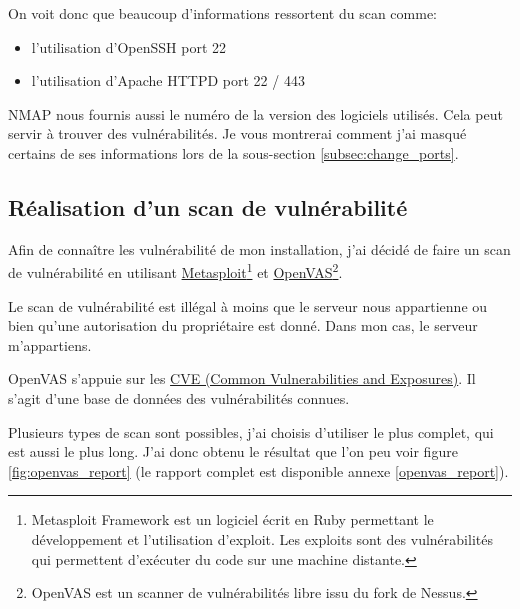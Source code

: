 \documentclass[]{report}
\begin{document}
      On voit donc que beaucoup d'informations ressortent du scan comme:

      \begin{itemize}
        \item l'utilisation d'OpenSSH port 22
        \item l'utilisation d'Apache HTTPD port 22 / 443
      \end{itemize}

      NMAP nous fournis aussi le numéro de la version des logiciels utilisés. Cela peut servir à trouver des vulnérabilités. Je vous montrerai comment j'ai masqué certains de ses informations lors de la sous-section \ref{subsec:change_ports}.

    \subsection{Réalisation d'un scan de vulnérabilité}

      Afin de connaître les vulnérabilité de mon installation, j'ai décidé de faire un scan de vulnérabilité en utilisant \href{https://www.metasploit.com/}{Metasploit}\footnote{Metasploit Framework est un logiciel écrit en Ruby permettant le développement et l’utilisation d'exploit. Les exploits sont des vulnérabilités qui permettent d’exécuter du code sur une machine distante.} et \href{http://www.openvas.org/}{OpenVAS}\footnote{OpenVAS est un scanner de vulnérabilités libre issu du fork de Nessus.}.

      Le scan de vulnérabilité est illégal à moins que le serveur nous appartienne ou bien qu'une autorisation du propriétaire est donné. Dans mon cas, le serveur m’appartiens.

      OpenVAS s'appuie sur les \href{https://cve.mitre.org/}{CVE (Common Vulnerabilities and Exposures)}. Il s'agit d'une base de données des vulnérabilités connues.

      Plusieurs types de scan sont possibles, j'ai choisis d'utiliser le plus complet, qui est aussi le plus long. J'ai donc obtenu le résultat que l'on peu voir figure \ref{fig:openvas_report} (le rapport complet est disponible annexe \ref{openvas_report}).
\end{document}
